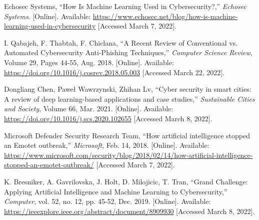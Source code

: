 \begin{thebibliography}{99}
    Echosec Systems, ``How Is Machine Learning Used in Cybersecurity?,''
    \textit{Echosec Systems}. [Online].
    Available: \href{https://www.echosec.net/blog/how-is-machine-learning-used-in-cybersecurity}{https://www.echosec.net/blog/how-is-machine-learning-used-in-cybersecurity}
    [Accessed March 7, 2022].

    I. Qabajeh, F. Thabtah, F. Chiclana, ``A Recent Review of Conventional vs. Automated Cybersecurity Anti-Phishing Techniques,''
    \textit{Computer Science Review}, Volume 29, Pages 44-55, Aug. 2018. [Online].
    Available: \href{https://doi.org/10.1016/j.cosrev.2018.05.003}{https://doi.org/10.1016/j.cosrev.2018.05.003}
    [Accessed March 22, 2022].

    Dongliang Chen, Paweł Wawrzynski, Zhihan Lv, ``Cyber security in smart cities: A review of deep learning-based applications and case studies,''
    \textit{Sustainable Cities and Society}, Volume 66, Mar. 2021. [Online].
    Available: \href{https://doi.org/10.1016/j.scs.2020.102655}{https://doi.org/10.1016/j.scs.2020.102655}
    [Accessed March 8, 2022].

    Microsoft Defender Security Research Team, ``How artificial intelligence stopped an Emotet outbreak,''
    \textit{Microsoft}, Feb. 14, 2018. [Online].
    Available: \href{https://www.microsoft.com/security/blog/2018/02/14/how-artificial-intelligence-stopped-an-emotet-outbreak/}{https://www.microsoft.com/security/blog/2018/02/14/how-artificial-intelligence-stopped-an-emotet-outbreak/}
    [Accessed March 7, 2022].

    K. Bresniker, A. Gavrilovska, J. Holt, D. Milojicic, T. Tran, ``Grand Challenge: Applying Artificial Intelligence and Machine Learning to Cybersecurity,''
    \textit{Computer}, vol. 52, no. 12, pp. 45-52, Dec. 2019. [Online].
    Available: \href{https://ieeexplore.ieee.org/abstract/document/8909930}{https://ieeexplore.ieee.org/abstract/document/8909930}
    [Accessed March 8, 2022].
\end{thebibliography}
